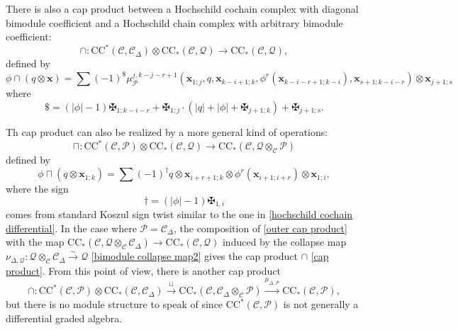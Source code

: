 \documentclass[11pt]{amsproc}
\def\cP{\mathcal{P}}
\def\cQ{\mathcal{Q}}
\def\cc{\mathcal{C}}
\def\r#1{\mathrm{#1}}
\def\D{\Delta}
\theoremstyle{remark}
\numberwithin{equation}{section}
\begin{document}
There is also a cap product between a Hochschild cochain complex with diagonal bimodule coefficient and a Hochschild chain complex with arbitrary bimodule coefficient:
\begin{equation}\label{cap product}
\cap: \r{CC}^{*}(\cc, \cc_{\D}) \otimes \r{CC}_{*}(\cc, \cQ) \to \r{CC}_{*}(\cc, \cQ),
\end{equation}
defined by
\begin{equation}
\phi \cap (q \otimes \mathbf{x}) = \sum (-1)^{\$} \mu_{\cP}^{j, k-j-r+1}(\mathbf{x}_{1; j}, q, \mathbf{x}_{k-i+1; k}, \phi^{r}(\mathbf{x}_{k-i-r+1; k-i}), \mathbf{x}_{s+1; k-i-r}) \otimes \mathbf{x}_{j+1; s}
\end{equation}
where 
\begin{equation}
\$ = (|\phi|-1)\maltese_{1; k-i-r} + \maltese_{1;j} \cdot (|q| + |\phi| + \maltese_{j+1; k}) + \maltese_{j+1;s}.
\end{equation}

Th cap product can also be realized by a more general kind of operations:
\begin{equation}\label{outer cap product}
\sqcap: \r{CC}^{*}(\cc, \cP) \otimes \r{CC}_{*}(\cc, \cQ) \to \r{CC}_{*}(\cc, \cQ \otimes_{\cc} \cP)
\end{equation}
defined by
\begin{equation}\label{outer cap product formula}
\phi \sqcap (q \otimes \mathbf{x}_{1;k}) = \sum (-1)^{\dagger} q \otimes \mathbf{x}_{ i+r+1; k} \otimes \phi^{r}(\mathbf{x}_{i+1; i+r}) \otimes \mathbf{x}_{1;i},
\end{equation}
where the sign
\begin{equation}\label{sign for cap}
\dagger  = (|\phi|-1) \maltese_{1, i}
\end{equation}
comes from standard Koszul sign twist similar to the one in \eqref{hochschild cochain differential}.
In the case where $\cP = \cc_{\D}$, the composition of \eqref{outer cap product} with the map $\r{CC}_{*}(\cc, \cQ \otimes_{\cc} \cc_{\D}) \to \r{CC}_{*}(\cc, \cQ)$ induced by the collapse map $\nu_{\D, \cQ}: \cQ \otimes_{\cc} \cc_{\D} \stackrel{\sim}\to \cQ$ \eqref{bimodule collapse map2} gives the cap product $\cap$ \eqref{cap product}.
From this point of view, there is another cap product
\begin{equation}
\cap: \r{CC}^{*}(\cc, \cP) \otimes \r{CC}_{*}(\cc, \cc_{\D}) \stackrel{\sqcup}\to \r{CC}_{*}(\cc, \cc_{\D} \otimes_{\cc} \cP) \stackrel{\mu_{\D, \cP}}\to \r{CC}_{*}(\cc, \cP),
\end{equation}
but there is no module structure to speak of since $\r{CC}^{*}(\cc, \cP)$ is not generally a differential graded algebra.
\end{document}
